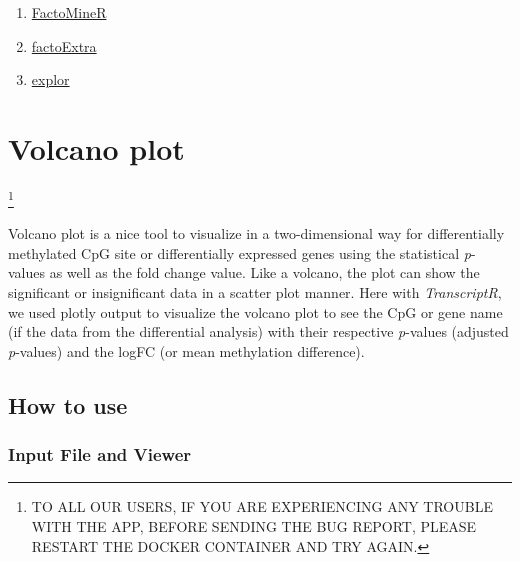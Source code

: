\documentclass[
  a4paper,
  oneside,
  open=any]{scrreport}
\providecommand{\tightlist}{%
  \setlength{\itemsep}{0pt}\setlength{\parskip}{0pt}}\usepackage{longtable,booktabs,array}
\begin{document}
\begin{enumerate}
\def\labelenumi{\arabic{enumi}.}
\tightlist
\item
  \href{https://cran.r-project.org/web/packages/FactoMineR/FactoMineR.pdf}{FactoMineR}
\item
  \href{https://cran.r-project.org/web/packages/factoextra/factoextra.pdf}{factoExtra}
\item
  \href{https://cran.r-project.org/web/packages/explor/explor.pdf}{explor}
\end{enumerate}

\hypertarget{sec-volcano}{%
\chapter{Volcano plot}\label{sec-volcano}}

\footnote{TO ALL OUR USERS, IF YOU ARE EXPERIENCING ANY TROUBLE WITH THE
  APP, BEFORE SENDING THE BUG REPORT, PLEASE RESTART THE DOCKER
  CONTAINER AND TRY AGAIN.}

Volcano plot is a nice tool to visualize in a two-dimensional way for
differentially methylated CpG site or differentially expressed genes
using the statistical \emph{p}-values as well as the fold change value.
Like a volcano, the plot can show the significant or insignificant data
in a scatter plot manner. Here with \emph{TranscriptR}, we used plotly
output to visualize the volcano plot to see the CpG or gene name (if the
data from the differential analysis) with their respective
\emph{p}-values (adjusted \emph{p}-values) and the logFC (or mean
methylation difference).

\hypertarget{how-to-use-3}{%
\section{How to use}\label{how-to-use-3}}

\hypertarget{input-file-and-viewer}{%
\subsection{Input File and Viewer}\label{input-file-and-viewer}}
\end{document}
